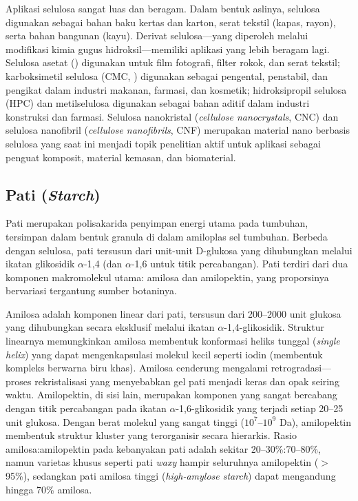 \documentclass[12pt,a4paper,openany]{book}
\begin{document}
Aplikasi selulosa sangat luas dan beragam. Dalam bentuk aslinya, selulosa digunakan sebagai bahan baku kertas dan karton, serat tekstil (kapas, rayon), serta bahan bangunan (kayu). Derivat selulosa---yang diperoleh melalui modifikasi kimia gugus hidroksil---memiliki aplikasi yang lebih beragam lagi. Selulosa asetat () digunakan untuk film fotografi, filter rokok, dan serat tekstil; karboksimetil selulosa (CMC, ) digunakan sebagai pengental, penstabil, dan pengikat dalam industri makanan, farmasi, dan kosmetik; hidroksipropil selulosa (HPC) dan metilselulosa digunakan sebagai bahan aditif dalam industri konstruksi dan farmasi. Selulosa nanokristal (\textit{cellulose nanocrystals}, CNC) dan selulosa nanofibril (\textit{cellulose nanofibrils}, CNF) merupakan material nano berbasis selulosa yang saat ini menjadi topik penelitian aktif untuk aplikasi sebagai penguat komposit, material kemasan, dan biomaterial.

\subsection{Pati (\textit{Starch})}
\label{subsec:pati}

Pati merupakan polisakarida penyimpan energi utama pada tumbuhan, tersimpan dalam bentuk granula di dalam amiloplas sel tumbuhan. Berbeda dengan selulosa, pati tersusun dari unit-unit D-glukosa yang dihubungkan melalui ikatan glikosidik $\alpha$-1,4 (dan $\alpha$-1,6 untuk titik percabangan). Pati terdiri dari dua komponen makromolekul utama: amilosa dan amilopektin, yang proporsinya bervariasi tergantung sumber botaninya.

Amilosa adalah komponen linear dari pati, tersusun dari 200--2000 unit glukosa yang dihubungkan secara eksklusif melalui ikatan $\alpha$-1,4-glikosidik. Struktur linearnya memungkinkan amilosa membentuk konformasi heliks tunggal (\textit{single helix}) yang dapat mengenkapsulasi molekul kecil seperti iodin (membentuk kompleks berwarna biru khas). Amilosa cenderung mengalami retrogradasi---proses rekristalisasi yang menyebabkan gel pati menjadi keras dan opak seiring waktu. Amilopektin, di sisi lain, merupakan komponen yang sangat bercabang dengan titik percabangan pada ikatan $\alpha$-1,6-glikosidik yang terjadi setiap 20--25 unit glukosa. Dengan berat molekul yang sangat tinggi (${10^7}$--${10^9}$ Da), amilopektin membentuk struktur kluster yang terorganisir secara hierarkis. Rasio amilosa:amilopektin pada kebanyakan pati adalah sekitar 20--30\%:70--80\%, namun varietas khusus seperti pati \textit{waxy} hampir seluruhnya amilopektin ($>$95\%), sedangkan pati amilosa tinggi (\textit{high-amylose starch}) dapat mengandung hingga 70\% amilosa.
\end{document}
